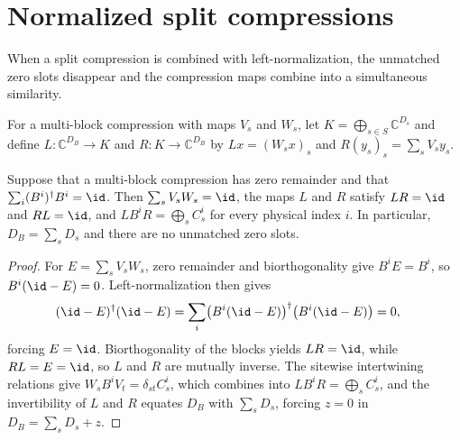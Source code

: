 \section{Normalized split compressions}%
\label{sec:asym_normalized_similarity}

When a split compression is combined with left-normalization, the unmatched
zero slots disappear and the compression maps combine into a simultaneous
similarity.

\begin{definition}
    \label{def:asym_assembled_compression}
    \leanok
    For a multi-block compression with maps $V_s$ and $W_s$, let
    $K=\bigoplus_{s\in S}\mathbb C^{D_s}$ and define
    $L:\mathbb C^{D_B}\to K$ and $R:K\to\mathbb C^{D_B}$ by
    $Lx=(W_sx)_s$ and $R(y_s)_s=\sum_sV_sy_s$.
\end{definition}

\begin{lemma}
    \label{thm:asym_normalized_split_similarity}
    \leanok
    Suppose that a multi-block compression has zero remainder and that
    $\sum_i(B^i)^\dagger B^i=\id$. Then
    $\sum_sV_sW_s=\id$, the maps $L$ and $R$ satisfy $LR=\id$ and
    $RL=\id$, and $LB^iR=\bigoplus_sC_s^i$ for every physical index $i$.
    In particular, $D_B=\sum_sD_s$ and there are no unmatched zero slots.
\end{lemma}

\begin{proof}
    \leanok
    For $E=\sum_sV_sW_s$, zero remainder and biorthogonality give
    $B^iE=B^i$, so $B^i(\id-E)=0$. Left-normalization then gives
    \begin{align}
        (\id-E)^\dagger(\id-E)
         & =\sum_i\bigl(B^i(\id-E)\bigr)^\dagger
        \bigl(B^i(\id-E)\bigr)=0,
    \end{align}
    forcing $E=\id$. Biorthogonality of the blocks yields $LR=\id$, while
    $RL=E=\id$, so $L$ and $R$ are mutually inverse. The sitewise
    intertwining relations give $W_sB^iV_t=\delta_{st}C_s^i$, which combines
    into $LB^iR=\bigoplus_sC_s^i$, and the invertibility of $L$ and $R$
    equates $D_B$ with $\sum_sD_s$, forcing $z=0$ in $D_B=\sum_sD_s+z$.
\end{proof}

